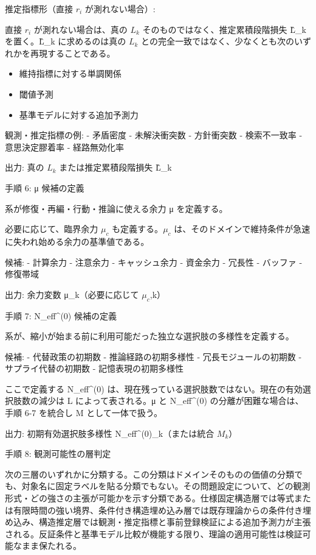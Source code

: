 \documentclass[12pt,a4paper]{article}
\begin{document}
推定指標形（直接 \(r_{i}\) が測れない場合）:

直接 \(r_{i}\) が測れない場合は、真の \(L_{k}\) そのものではなく、推定累積段階損失 L̂\_k を置く。L̂\_k に求めるのは真の \(L_{k}\) との完全一致ではなく、少なくとも次のいずれかを再現することである。

\begin{itemize}
\tightlist
\item
  維持指標に対する単調関係
\item
  閾値予測
\item
  基準モデルに対する追加予測力
\end{itemize}

観測・推定指標の例: - 矛盾密度 - 未解決衝突数 - 方針衝突数 - 検索不一致率 - 意思決定膠着率 - 経路無効化率

出力: 真の \(L_{k}\) または推定累積段階損失 L̂\_k

手順 6: μ 候補の定義

系が修復・再編・行動・推論に使える余力 μ を定義する。

必要に応じて、臨界余力 \(\mu_{c}\) も定義する。\(\mu_{c}\) は、そのドメインで維持条件が急速に失われ始める余力の基準値である。

候補: - 計算余力 - 注意余力 - キャッシュ余力 - 資金余力 - 冗長性 - バッファ - 修復帯域

出力: 余力変数 μ\_k（必要に応じて \(\mu_{c}\),k）

手順 7: N\_eff\^{}(0) 候補の定義

系が、縮小が始まる前に利用可能だった独立な選択肢の多様性を定義する。

候補: - 代替政策の初期数 - 推論経路の初期多様性 - 冗長モジュールの初期数 - サプライ代替の初期数 - 記憶表現の初期多様性

ここで定義する N\_eff\^{}(0) は、現在残っている選択肢数ではない。現在の有効選択肢数の減少は L によって表される。μ と N\_eff\^{}(0) の分離が困難な場合は、手順 6-7 を統合し M として一体で扱う。

出力: 初期有効選択肢多様性 N\_eff\^{}(0)\_k（または統合 \(M_{k}\)）

手順 8: 観測可能性の層判定

次の三層のいずれかに分類する。この分類はドメインそのものの価値の分類でも、対象名に固定ラベルを貼る分類でもない。その問題設定について、どの観測形式・どの強さの主張が可能かを示す分類である。仕様固定構造層では等式または有限時間の強い境界、条件付き構造埋め込み層では既存理論からの条件付き埋め込み、構造推定層では観測・推定指標と事前登録検証による追加予測力が主張される。反証条件と基準モデル比較が機能する限り、理論の適用可能性は検証可能なまま保たれる。
\end{document}
